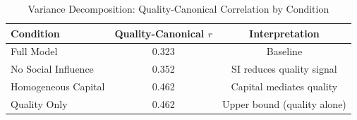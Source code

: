 \begin{table}[H]
\centering
\caption{Variance Decomposition: Quality-Canonical Correlation by Condition}
\label{tab:variance_decomposition}
\begin{tabular}{@{}lcc@{}}
\toprule
\textbf{Condition} & \textbf{Quality-Canonical $r$} & \textbf{Interpretation} \\
\midrule
Full Model & 0.323 & Baseline \\
No Social Influence & 0.352 & SI reduces quality signal \\
Homogeneous Capital & 0.462 & Capital mediates quality \\
Quality Only & 0.462 & Upper bound (quality alone) \\
\bottomrule
\end{tabular}
\end{table}